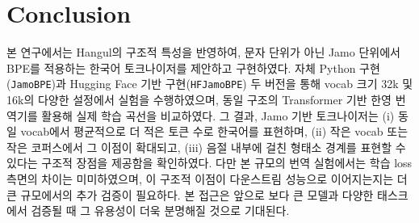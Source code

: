 \documentclass[sigconf,nonacm]{acmart}
\begin{document}
\section{Conclusion}
\label{sec:conclusion}

본 연구에서는 Hangul의 구조적 특성을 반영하여, 문자 단위가 아닌 Jamo 단위에서 BPE를 적용하는
한국어 토크나이저를 제안하고 구현하였다. 자체 Python 구현(\texttt{JamoBPE})과
Hugging Face 기반 구현(\texttt{HFJamoBPE}) 두 버전을 통해 vocab 크기 32k 및 16k의 다양한 설정에서
실험을 수행하였으며, 동일 구조의 Transformer 기반 한영 번역기를 활용해 실제 학습 곡선을
비교하였다. 그 결과, Jamo 기반 토크나이저는 (i) 동일 vocab에서 평균적으로 더 적은 토큰 수로
한국어를 표현하며, (ii) 작은 vocab 또는 작은 코퍼스에서 그 이점이 확대되고,
(iii) 음절 내부에 걸친 형태소 경계를 표현할 수 있다는 구조적 장점을 제공함을 확인하였다.
다만 본 규모의 번역 실험에서는 학습 loss 측면의 차이는 미미하였으며, 이 구조적 이점이
다운스트림 성능으로 이어지는지는 더 큰 규모에서의 추가 검증이 필요하다. 본 접근은 앞으로 보다 큰
모델과 다양한 태스크에서 검증될 때 그 유용성이 더욱 분명해질 것으로 기대된다.
\end{document}
